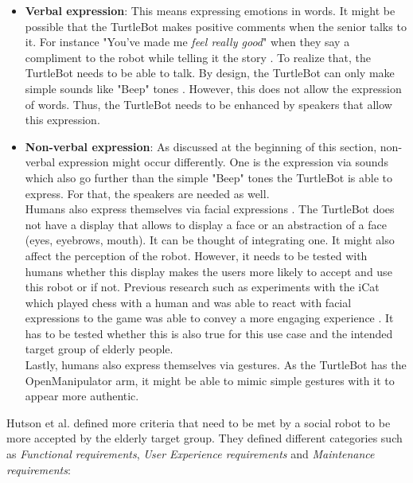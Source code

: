\documentclass[plainarticle,zihtitle,english,final,hyperref,utf8]{zihpub}
\begin{document}
\begin{itemize}
    \item \textbf{Verbal expression}: This means expressing emotions in words. It might be possible that the TurtleBot makes positive comments when the senior talks to it. For instance "You've made me \textit{feel really good}" when they say a compliment to the robot while telling it the story . To realize that, the TurtleBot needs to be able to talk. By design, the TurtleBot can only make simple sounds like "Beep" tones \cite{tbspecificiations}. However, this does not allow the expression of words. Thus, the TurtleBot needs to be enhanced by speakers that allow this expression.
    \item \textbf{Non-verbal expression}: As discussed at the beginning of this section, non-verbal expression might occur differently. One is the expression via sounds which also go further than the simple "Beep" tones the TurtleBot is able to express. For that, the speakers are needed as well. \\
    \newline
    Humans also express themselves via facial expressions . The TurtleBot does not have a display that allows to display a face or an abstraction of a face (eyes, eyebrows, mouth). It can be thought of integrating one. It might also affect the perception of the robot. However, it needs to be tested with humans whether this display makes the users more likely to accept and use this robot or if not. Previous research such as experiments with the iCat which played chess with a human and was able to react with facial expressions to the game was able to convey a more engaging experience . It has to be tested whether this is also true for this use case and the intended target group of elderly people. \\
    \newline
    Lastly, humans also express themselves via gestures. As the TurtleBot has the OpenManipulator arm, it might be able to mimic simple gestures with it to appear more authentic. 
\end{itemize}
Hutson et al.  defined more criteria that need to be met by a social robot to be more accepted by the elderly target group. They defined different categories such as \textit{Functional requirements}, \textit{User Experience requirements} and \textit{Maintenance requirements}:\\
\newline
\end{document}

